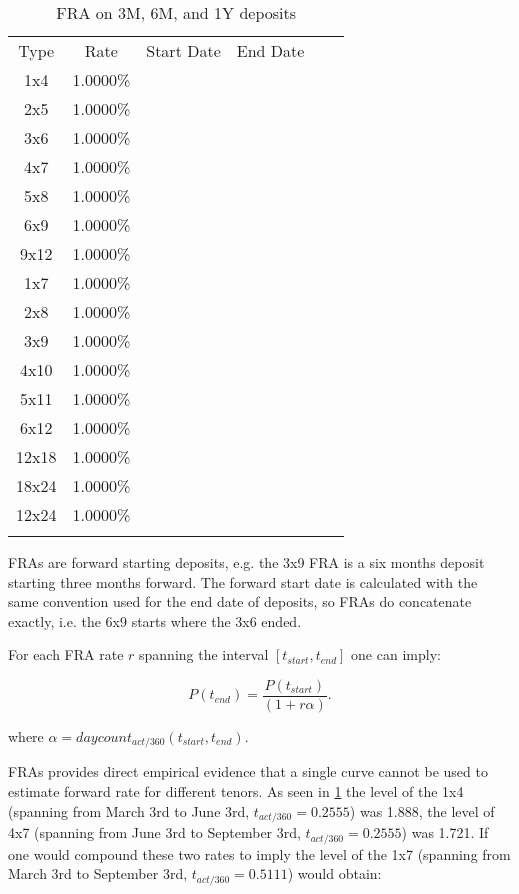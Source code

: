 \documentclass[11pt,reqno]{amsart}
\begin{document}
\begin{table}[tbp]
\label{tab:fra}
\begin{tabular}{cccccc}
Type & Rate & Start Date & End Date &  &  \\
1x4 & 1.0000\% &  &  &  &  \\
2x5 & 1.0000\% &  &  &  &  \\
3x6 & 1.0000\% &  &  &  &  \\
4x7 & 1.0000\% &  &  &  &  \\
5x8 & 1.0000\% &  &  &  &  \\
6x9 & 1.0000\% &  &  &  &  \\
9x12 & 1.0000\% &  &  &  &  \\
1x7 & 1.0000\% &  &  &  &  \\
2x8 & 1.0000\% &  &  &  &  \\
3x9 & 1.0000\% &  &  &  &  \\
4x10 & 1.0000\% &  &  &  &  \\
5x11 & 1.0000\% &  &  &  &  \\
6x12 & 1.0000\% &  &  &  &  \\
12x18 & 1.0000\% &  &  &  &  \\
18x24 & 1.0000\% &  &  &  &  \\
12x24 & 1.0000\% &  &  &  &  \\
&  &  &  &  &
\end{tabular}%
\caption{FRA on 3M, 6M, and 1Y deposits}
\end{table}

FRAs are forward starting deposits, e.g. the 3x9 FRA is a six months deposit
starting three months forward. The forward start date is
calculated with the same convention used for the end date of deposits,
so FRAs do concatenate exactly, i.e. the 6x9 starts where the 3x6 ended.

For each FRA rate $r$ spanning the interval $[t_{start}, t_{end}]$ one can imply:

\begin{equation}
P(t_{end}) = \frac{P(t_{start})}{(1 + r \alpha)}.
\label{eqn:deposit}
\end{equation}

where $\alpha = daycount_{act/360}(t_{start}, t_{end})$.


FRAs provides direct empirical evidence that a single curve
cannot be used to estimate forward rate for different tenors.
As seen in \ref{tab:fra} the level of the 1x4
(spanning from March 3rd to June 3rd, $t_{act/360} = 0.2555$) was 1.888,
the level of
4x7 (spanning from June 3rd to September 3rd, $t_{act/360} = 0.2555$) was 1.721.
If one would compound these two rates to imply the level of the 1x7
(spanning from March 3rd to September 3rd, $t_{act/360} = 0.5111$) would obtain:
\end{document}
